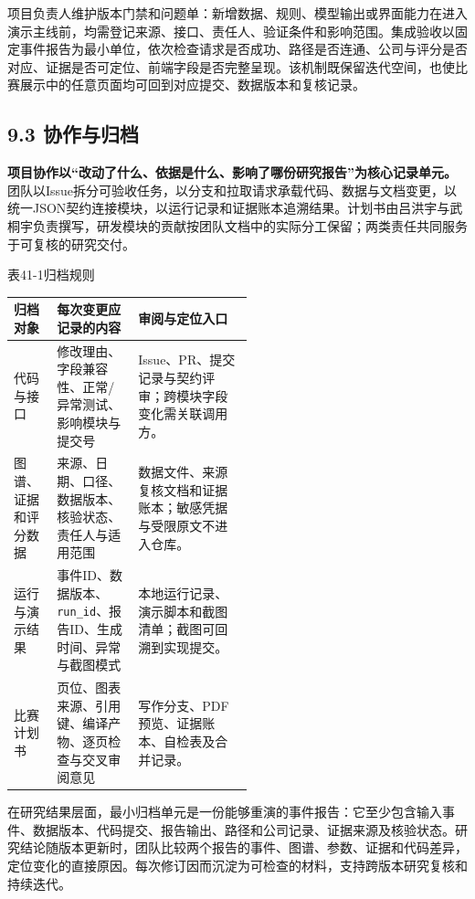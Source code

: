 项目负责人维护版本门禁和问题单：新增数据、规则、模型输出或界面能力在进入演示主线前，均需登记来源、接口、责任人、验证条件和影响范围。集成验收以固定事件报告为最小单位，依次检查请求是否成功、路径是否连通、公司与评分是否对应、证据是否可定位、前端字段是否完整呈现。该机制既保留迭代空间，也使比赛展示中的任意页面均可回到对应提交、数据版本和复核记录。


\subsection*{9.3 协作与归档}\label{page:41}
\noindent\textbf{项目协作以“改动了什么、依据是什么、影响了哪份研究报告”为核心记录单元。}团队以Issue拆分可验收任务，以分支和拉取请求承载代码、数据与文档变更，以统一JSON契约连接模块，以运行记录和证据账本追溯结果。计划书由吕洪宇与武桐宇负责撰写，研发模块的贡献按团队文档中的实际分工保留；两类责任共同服务于可复核的研究交付\cite{lhy-team,lhy-data-standard}。

\begin{center}\small 表41-1\quad 归档规则\par\vspace{1mm}
\begin{tabularx}{\linewidth}{p{0.18\linewidth}p{0.34\linewidth}X}
\toprule
归档对象 & 每次变更应记录的内容 & 审阅与定位入口\\
\midrule
代码与接口 & 修改理由、字段兼容性、正常/异常测试、影响模块与提交号 & Issue、PR、提交记录与契约评审；跨模块字段变化需关联调用方。\\
图谱、证据和评分数据 & 来源、日期、口径、数据版本、核验状态、责任人与适用范围 & 数据文件、来源复核文档和证据账本；敏感凭据与受限原文不进入仓库。\\
运行与演示结果 & 事件ID、数据版本、\texttt{run\_id}、报告ID、生成时间、异常与截图模式 & 本地运行记录、演示脚本和截图清单；截图可回溯到实现提交。\\
比赛计划书 & 页位、图表来源、引用键、编译产物、逐页检查与交叉审阅意见 & 写作分支、PDF预览、证据账本、自检表及合并记录。\\
\bottomrule
\end{tabularx}\end{center}

在研究结果层面，最小归档单元是一份能够重演的事件报告：它至少包含输入事件、数据版本、代码提交、报告输出、路径和公司记录、证据来源及核验状态。研究结论随版本更新时，团队比较两个报告的事件、图谱、参数、证据和代码差异，定位变化的直接原因。每次修订因而沉淀为可检查的材料，支持跨版本研究复核和持续迭代。

